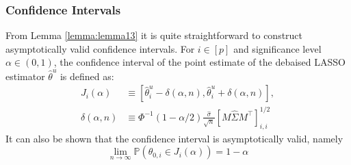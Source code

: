 \documentclass{article}
\begin{document}
\subsubsection{Confidence Intervals}
\label{sec:2.3.1}
From Lemma \ref{lemma:lemma13} it is quite straightforward to construct asymptotically valid confidence intervals. For $i \in [p]$ and significance level $\alpha \in (0,1)$, the confidence interval of the point estimate of the debaised LASSO estimator $\hat{\theta}^u$ is defined as:
\begin{equation}
\label{eq:ci_formula}
\begin{aligned}
    J_i(\alpha) &\equiv \left[ \hat{\theta}_i^u - \delta(\alpha, n), \hat{\theta}_i^u + \delta(\alpha, n) \right], \\
    \delta(\alpha, n) &\equiv \Phi^{-1}(1 - \alpha/2) \frac{\hat{\sigma}}{\sqrt{n}} [M \hat{\Sigma} M^\top]_{i,i}^{1/2}
\end{aligned}
\end{equation}
It can also be shown that the confidence interval is asymptotically valid, namely 
\begin{equation}
    \lim_{n \to \infty} \mathbb{P}\left(\theta_{0,i} \in J_i(\alpha) \right) = 1-\alpha
\end{equation}
\end{document}
